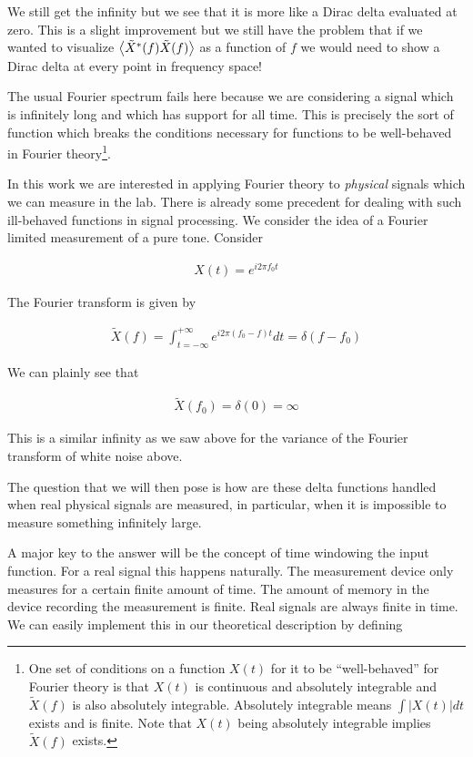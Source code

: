 \documentclass[12pt]{article}
\begin{document}
We still get the infinity but we see that it is more like a Dirac delta evaluated at zero. 
This is a slight improvement but we still have the problem that if we wanted to visualize $\Braket{\tilde{X}^*(f)\tilde{X}(f)}$ as a function of $f$ we would need to show a Dirac delta at every point in frequency space!

The usual Fourier spectrum fails here because we are considering a signal which is infinitely long and which has support for all time.
This is precisely the sort of function which breaks the conditions necessary for functions to be well-behaved in Fourier theory\footnote{One set of conditions on a function $X(t)$ for it to be ``well-behaved'' for Fourier theory is that $X(t)$ is continuous and absolutely integrable and $\tilde{X}(f)$ is also absolutely integrable. Absolutely integrable means $\int |X(t)| dt$ exists and is finite. Note that $X(t)$ being absolutely integrable implies $\tilde{X}(f)$ exists.}.

In this work we are interested in applying Fourier theory to \textit{physical} signals which we can measure in the lab.
There is already some precedent for dealing with such ill-behaved functions in signal processing.
We consider the idea of a Fourier limited measurement of a pure tone.
Consider

\begin{align}
X(t) = e^{i 2\pi f_0 t}
\end{align}

The Fourier transform is given by

\begin{align}
\tilde{X}(f) = \int_{t=-\infty}^{+\infty} e^{i 2\pi (f_0 - f)t} dt = \delta(f-f_0)
\end{align}

We can plainly see that

\begin{align}
\tilde{X}(f_0) = \delta(0) = \infty
\end{align}

This is a similar infinity as we saw above for the variance of the Fourier transform of white noise above.

The question that we will then pose is how are these delta functions handled when real physical signals are measured, in particular, when it is impossible to measure something infinitely large.

A major key to the answer will be the concept of time windowing the input function.
For a real signal this happens naturally.
The measurement device only measures for a certain finite amount of time.
The amount of memory in the device recording the measurement is finite.
Real signals are always finite in time.
We can easily implement this in our theoretical description by defining
\end{document}
